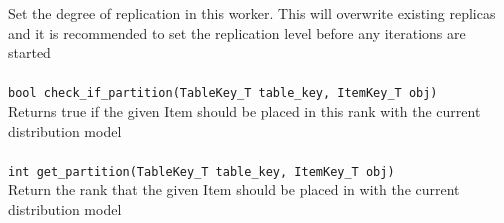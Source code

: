 \documentclass{uit-report}
\begin{document}
\phantom{11111}\phantom{11111} Set the degree of replication in this worker. This will overwrite existing replicas and it is recommended to set the replication level before any iterations are started\\\\
\phantom{11111} \texttt{bool check\_if\_partition(TableKey\_T table\_key, ItemKey\_T obj)}\\
\phantom{11111}\phantom{11111} Returns true if the given Item should be placed in this rank with the current distribution model\\\\
\phantom{11111} \texttt{int get\_partition(TableKey\_T table\_key, ItemKey\_T obj)}\\
\phantom{11111}\phantom{11111} Return the rank that the given Item should be placed in with the current distribution model\\\\

\end{document}
